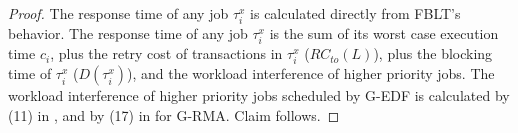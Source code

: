 \documentclass[prodmode,acmtecs]{acmsmall}
\begin{document}
\begin{proof}
The response time of any job $\tau_i^x$ is calculated directly from FBLT's behavior. 
The response time of any job $\tau_{i}^{x}$ is the sum of its
worst case execution time $c_{i}$, plus the retry cost of transactions
in $\tau_{i}^{x}$ ($RC_{to}(L)$), plus the blocking time of $\tau_{i}^{x}$
($D(\tau_{i}^{x})$), and the workload interference of higher priority
jobs. The workload interference of higher priority jobs scheduled by
G-EDF is calculated by (11) in \cite{stmconcurrencycontrol:emsoft11},
and by (17) in \cite{stmconcurrencycontrol:emsoft11} for G-RMA. Claim follows.
\end{proof}





\received{}{}{}


\medskip
\end{document}

